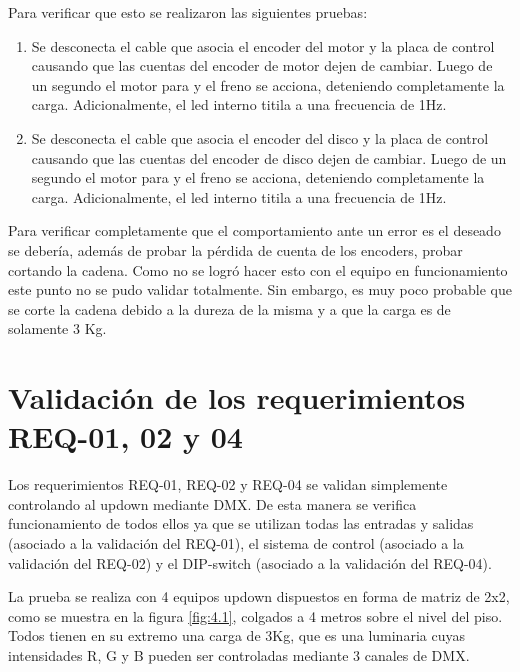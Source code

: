 Para verificar que esto se realizaron las siguientes pruebas:
\begin{enumerate}
	\item Se desconecta el cable que asocia el encoder del motor y la placa de control causando que las cuentas del encoder de motor dejen de cambiar. Luego de un segundo el motor para y el freno se acciona, deteniendo completamente la carga. Adicionalmente, el led interno titila a una frecuencia de 1Hz.
	\item Se desconecta el cable que asocia el encoder del disco y la placa de control  causando que las cuentas del encoder de disco dejen de cambiar. Luego de un segundo el motor para y el freno se acciona, deteniendo completamente la carga. Adicionalmente, el led interno titila a una frecuencia de 1Hz.
\end{enumerate}
Para verificar completamente que el comportamiento ante un error es el deseado se debería, además de probar la pérdida de cuenta de los encoders, probar cortando la cadena. Como no se logró hacer esto con el equipo en funcionamiento este punto no se pudo validar totalmente. Sin embargo, es muy poco probable que se corte la cadena debido a la dureza de la misma y a que la carga es de solamente 3 Kg.

\section{Validación de los requerimientos REQ-01, 02 y 04} \label{sec:\thesection}
Los requerimientos REQ-01, REQ-02 y REQ-04 se validan simplemente controlando al updown mediante DMX. De esta manera se verifica funcionamiento de todos ellos ya que se utilizan todas las entradas y salidas (asociado a la validación del REQ-01), el sistema de control (asociado a la validación del REQ-02) y el DIP-switch (asociado a la validación del REQ-04).

La prueba se realiza con 4 equipos updown dispuestos en forma de matriz de 2x2, como se muestra en la figura \ref{fig:4.1}, colgados a 4 metros sobre el nivel del piso. Todos tienen en su extremo una carga de 3Kg, que es una luminaria cuyas intensidades R, G y B pueden ser controladas mediante 3 canales de DMX.

